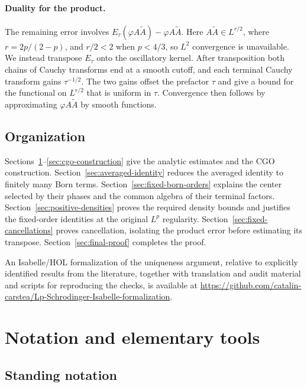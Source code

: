 \documentclass[a4paper,11pt]{article}
\theoremstyle{plain}
\theoremstyle{definition}
\theoremstyle{remark}
\begin{document}
\paragraph{Duality for the product.}
The remaining error involves $E_\tau(\varphi A\widetilde A)-\varphi A\widetilde A$. Here $A\widetilde A\in L^{r/2}$, where $r=2p/(2-p)$, and $r/2<2$ when $p<4/3$, so $L^2$ convergence is unavailable. We instead transpose $E_\tau$ onto the oscillatory kernel. After transposition both chains of Cauchy transforms end at a smooth cutoff, and each terminal Cauchy transform gains $\tau^{-1/2}$. The two gains offset the prefactor $\tau$ and give a bound for the functional on $L^{r/2}$ that is uniform in $\tau$. Convergence then follows by approximating $\varphi A\widetilde A$ by smooth functions.

\subsection{Organization}

Sections~\ref{sec:preliminaries}--\ref{sec:cgo-construction} give the analytic estimates and the CGO construction. Section~\ref{sec:averaged-identity} reduces the averaged identity to finitely many Born terms. Section~\ref{sec:fixed-born-orders} explains the center selected by their phases and the common algebra of their terminal factors. Section~\ref{sec:positive-densities} proves the required density bounds and justifies the fixed-order identities at the original $L^p$ regularity. Section~\ref{sec:fixed-cancellations} proves cancellation, isolating the product error before estimating its transpose. Section~\ref{sec:final-proof} completes the proof.

An Isabelle/HOL formalization of the uniqueness argument, relative to explicitly identified results from the literature, together with translation and audit material and scripts for reproducing the checks, is available at \url{https://github.com/catalin-carstea/Lp-Schrodinger-Isabelle-formalization}.


\section{Notation and elementary tools}\label{sec:preliminaries}

\subsection{Standing notation}
\end{document}
